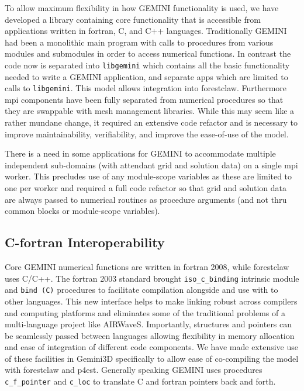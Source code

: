 \documentclass[11pt,letterpaper]{article}
\begin{document}
To allow maximum flexibility in how GEMINI functionality is used, we have developed a library containing core functionality that is accessible from applications written in fortran, C, and C++ languages.  Traditionally GEMINI had been a monolithic main program with calls to procedures from various modules and submodules in order to access numerical functions.  In contrast the code now is separated into \texttt{libgemini} which contains all the basic functionality needed to write a GEMINI application, and separate apps which are limited to calls to \texttt{libgemini}.  This model allows integration into forestclaw.  Furthermore mpi components have been fully separated from numerical procedures so that they are swappable with mesh management libraries.  While this may seem like a rather mundane change, it required an extensive code refactor and is necessary to improve maintainability, verifiability, and improve the ease-of-use of the model.  

There is a need in some applications for GEMINI to accommodate multiple independent sub-domains (with attendant grid and solution data) on a single mpi worker.  This precludes use of any module-scope variables as these are limited to one per worker and required a full code refactor so that grid and solution data are always passed to numerical routines as procedure arguments (and not thru common blocks or module-scope variables).  

\subsection{C-fortran Interoperability}

Core GEMINI numerical functions are written in fortran 2008, while forestclaw uses C/C++.  The fortran 2003 standard brought \texttt{iso\_c\_binding} intrinsic module and \texttt{bind (C)} procedures to facilitate compilation alongside and use with to other languages.  This new interface helps to make linking robust across compilers and computing platforms and eliminates some of the traditional problems of a multi-language project like AIRWaveS.  Importantly, structures and pointers can be seamlessly passed between languages allowing flexibility in memory allocation and ease of integration of different code components.  We have made extensive use of these facilities in Gemini3D specifically to allow ease of co-compiling the model with forestclaw and p4est.  Generally speaking GEMINI uses procedures \texttt{c\_f\_pointer} and \texttt{c\_loc} to translate C and fortran pointers back and forth.  
\end{document}
